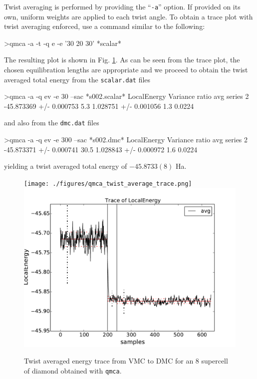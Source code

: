 Twist averaging is performed by providing the ``\texttt{-a}'' 
option.  If provided on its own, uniform weights are applied 
to each twist angle.  To obtain a trace plot with twist averaging 
enforced, use a command similar to the following:
\begin{shade}
>qmca -a -t -q e -e '30 20 30' *scalar*
\end{shade}
\noindent
The resulting plot is shown in Fig. \ref{fig:qmca_twist_average}.
As can be seen from the trace plot, the chosen equilibration lengths 
are appropriate and we proceed to obtain the twist averaged total energy
from the \texttt{scalar.dat} files
\begin{shade}
>qmca -a -q ev -e 30 --sac *s002.scalar*
                            LocalEnergy               Variance           ratio 
avg  series 2  -45.873369 +/- 0.000753    5.3   1.028751 +/- 0.001056    1.3   0.0224 
\end{shade}
\noindent
and also from the \texttt{dmc.dat} files
\begin{shade}
>qmca -a -q ev -e 300 --sac *s002.dmc*
                            LocalEnergy               Variance           ratio 
avg  series 2  -45.873371 +/- 0.000741   30.5   1.028843 +/- 0.000972    1.6   0.0224 
\end{shade}
\noindent
yielding a twist averaged total energy of $-45.8733(8)$ Ha. 

\begin{figure}
\begin{center}
\ifdefined\HCode
\texttt{[image: ./figures/qmca\_twist\_average\_trace.png]}
\else
\includegraphics[trim = 0mm 0mm 0mm 0mm, clip,width=0.75\columnwidth]{./figures/qmca_twist_average_trace.pdf}
\fi
\end{center}
\caption{Twist averaged energy trace from VMC to DMC for an 8 supercell of diamond obtained with \texttt{qmca}.}
\label{fig:qmca_twist_average}
\end{figure}

